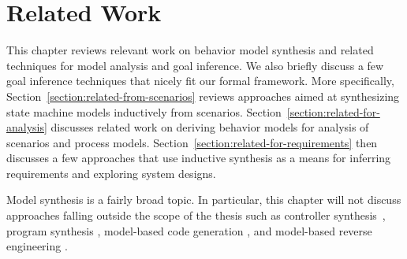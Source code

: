 \chapter{Related Work\label{chapter:related-work}}

This chapter reviews relevant work on behavior model synthesis and related techniques for model analysis and goal inference. We also briefly discuss a few goal inference techniques that nicely fit our formal framework. More specifically, Section~\ref{section:related-from-scenarios} reviews approaches aimed at synthesizing state machine models inductively from scenarios. Section~\ref{section:related-for-analysis} discusses related work on deriving behavior models for analysis of scenarios and process models. Section~\ref{section:related-for-requirements} then discusses a few approaches that use inductive synthesis as a means for inferring requirements and exploring system designs.

Model synthesis is a fairly broad topic. In particular, this chapter will not discuss approaches falling outside the scope of the thesis such as controller synthesis~\cite{Clarke:1981, Pnueli:1989, Asarin:1995}, program synthesis \cite{Manna:1971, Balzer:1985, Wasowski:2003}, model-based code generation \cite{Kohler:2000, Wasowski:2003}, and model-based reverse engineering \cite{Briand:2003, Yu:2005}.





